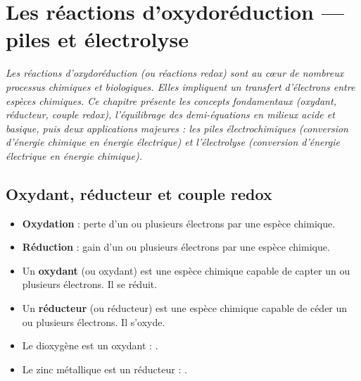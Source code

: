 \chapter{Les réactions d'oxydoréduction — piles et électrolyse}

\textit{Les réactions d'oxydoréduction (ou réactions redox) sont au cœur de nombreux processus chimiques et biologiques. Elles impliquent un transfert d'électrons entre espèces chimiques. Ce chapitre présente les concepts fondamentaux (oxydant, réducteur, couple redox), l'équilibrage des demi-équations en milieux acide et basique, puis deux applications majeures : les piles électrochimiques (conversion d'énergie chimique en énergie électrique) et l'électrolyse (conversion d'énergie électrique en énergie chimique).}

\section{Oxydant, réducteur et couple redox}

\begin{definition}
\begin{itemize}
    \item \textbf{Oxydation} : perte d'un ou plusieurs électrons par une espèce chimique.
    \item \textbf{Réduction} : gain d'un ou plusieurs électrons par une espèce chimique.
\end{itemize}
\end{definition}

\begin{definition}
\begin{itemize}
    \item Un \textbf{oxydant} (ou oxydant) est une espèce chimique capable de capter un ou plusieurs électrons. Il se réduit.
    \item Un \textbf{réducteur} (ou réducteur) est une espèce chimique capable de céder un ou plusieurs électrons. Il s'oxyde.
\end{itemize}
\end{definition}

\begin{exemple}
\begin{itemize}
    \item Le dioxygène  est un oxydant : .
    \item Le zinc métallique  est un réducteur : .
\end{itemize}
\end{exemple}

